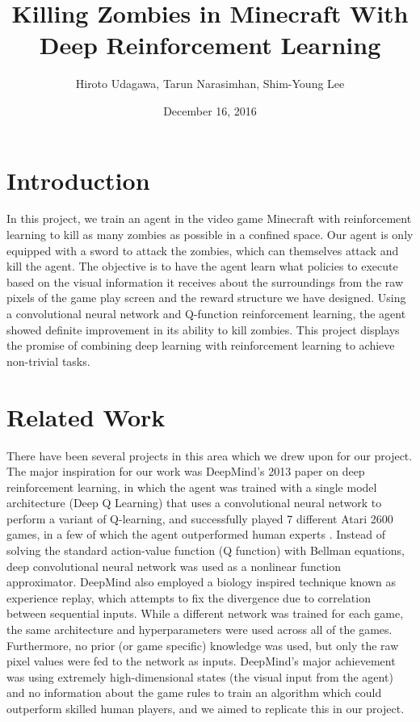 \documentclass{article}
\title{Killing Zombies in Minecraft With Deep Reinforcement Learning}
\author{Hiroto Udagawa, Tarun Narasimhan, Shim-Young Lee}
\date{December 16, 2016}
\begin{document}
\maketitle

\begin{multicols}{2}

\section{Introduction}

In this project, we train an agent in the video game Minecraft with reinforcement learning to kill as many zombies as possible in a confined space. Our agent is only equipped with a sword to attack the zombies,  which can themselves attack and kill the agent.
The objective is to have the agent learn what policies to execute based on the visual information it receives about the surroundings from the raw pixels of the game play screen and the reward structure we have designed.
Using a convolutional neural network and Q-function reinforcement learning, the agent showed definite improvement in its ability to kill zombies.
This project displays the promise of combining deep learning with reinforcement learning to achieve non-trivial tasks.






\section{Related Work}

There have been several projects in this area which we drew upon for our project.
The major inspiration for our work was DeepMind's 2013 paper on deep reinforcement learning, in which the agent was trained with a single model architecture (Deep Q Learning) that uses a convolutional neural network to perform a variant of Q-learning, and successfully played 7 different Atari 2600 games, in a few of which the agent outperformed human experts \cite{deepMind}.
Instead of solving the standard action-value function (Q function) with Bellman equations, deep convolutional neural network was used as a nonlinear function approximator. DeepMind also employed a biology inspired technique known as experience replay, which attempts to fix the divergence due to correlation between sequential inputs.
While a different network was trained for each game, the same architecture and hyperparameters were used across all of the games.
Furthermore, no prior (or game specific) knowledge was used, but only the raw pixel values were fed to the network as inputs.
DeepMind's major achievement was using extremely high-dimensional states (the visual input from the agent) and no information about the game rules to train an algorithm which could outperform skilled human players, and we aimed to replicate this in our project.


\end{multicols}
\end{document}
